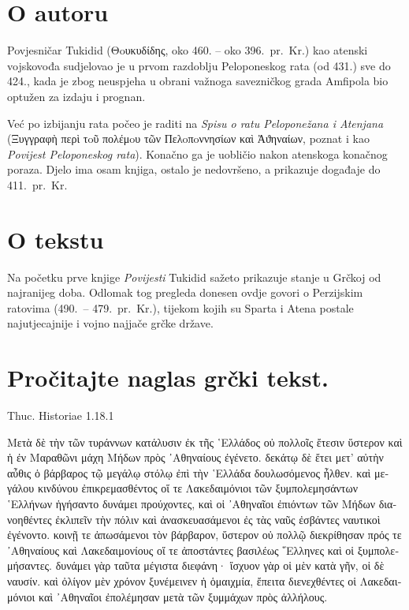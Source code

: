\section*{O autoru}

Povjesničar Tukidid \textgreek[variant=ancient]{(Θoυκυδίδης,} oko 460. – oko 396.\ pr.~Kr.) kao atenski vojskovođa sudjelovao je u prvom razdoblju Peloponeskog rata (od 431.) sve do 424., kada je zbog neuspjeha u obrani važnoga savezničkog grada Amfipola bio optužen za izdaju i prognan.

Već po izbijanju rata počeo je raditi na \textit{Spisu o ratu Peloponežana i Atenjana} \textgreek[variant=ancient]{(Ξυγγραφὴ περὶ τoῦ πολέμoυ τῶν Пελoπoννησίων καὶ Ἀϑηναίων,} poznat i kao \textit{Povijest Peloponeskog rata}). Konačno ga je uobličio nakon atenskoga konačnog poraza. Djelo ima osam knjiga, ostalo je nedovršeno, a prikazuje događaje do 411.\ pr.~Kr.

\section*{O tekstu}

Na početku prve knjige \textit{Povijesti} Tukidid sažeto prikazuje stanje u Grčkoj od najranijeg doba. Odlomak tog pregleda donesen ovdje govori o Perzijskim ratovima (490.\ – 479.\ pr.~Kr.), tijekom kojih su Sparta i Atena postale najutjecajnije i vojno najjače grčke države.

\newpage

\section*{Pročitajte naglas grčki tekst.}

Thuc. Historiae 1.18.1

\medskip

{\large
\begin{greek}
\noindent Μετὰ δὲ τὴν τῶν τυράννων κατάλυσιν ἐκ τῆς ῾Ελλάδος οὐ πολλοῖς ἔτεσιν ὕστερον καὶ ἡ ἐν Μαραθῶνι μάχη Μήδων πρὸς ᾿Αθηναίους ἐγένετο. δεκάτῳ δὲ ἔτει μετ' αὐτὴν αὖθις ὁ βάρβαρος τῷ μεγάλῳ στόλῳ ἐπὶ τὴν ῾Ελλάδα δουλωσόμενος ἦλθεν. καὶ μεγάλου κινδύνου ἐπικρεμασθέντος οἵ τε Λακεδαιμόνιοι τῶν ξυμπολεμησάντων ῾Ελλήνων ἡγήσαντο δυνάμει προύχοντες, καὶ οἱ ᾿Αθηναῖοι ἐπιόντων τῶν Μήδων διανοηθέντες ἐκλιπεῖν τὴν πόλιν καὶ ἀνασκευασάμενοι ἐς τὰς ναῦς ἐσβάντες ναυτικοὶ ἐγένοντο. κοινῇ τε ἀπωσάμενοι τὸν βάρβαρον, ὕστερον οὐ πολλῷ διεκρίθησαν πρός τε ᾿Αθηναίους καὶ Λακεδαιμονίους οἵ τε ἀποστάντες βασιλέως ῞Ελληνες καὶ οἱ ξυμπολεμήσαντες. δυνάμει γὰρ ταῦτα μέγιστα διεφάνη· ἴσχυον γὰρ οἱ μὲν κατὰ γῆν, οἱ δὲ ναυσίν. καὶ ὀλίγον μὲν χρόνον ξυνέμεινεν ἡ ὁμαιχμία, ἔπειτα διενεχθέντες οἱ Λακεδαιμόνιοι καὶ ᾿Αθηναῖοι ἐπολέμησαν μετὰ τῶν ξυμμάχων πρὸς ἀλλήλους.
\end{greek}

}

